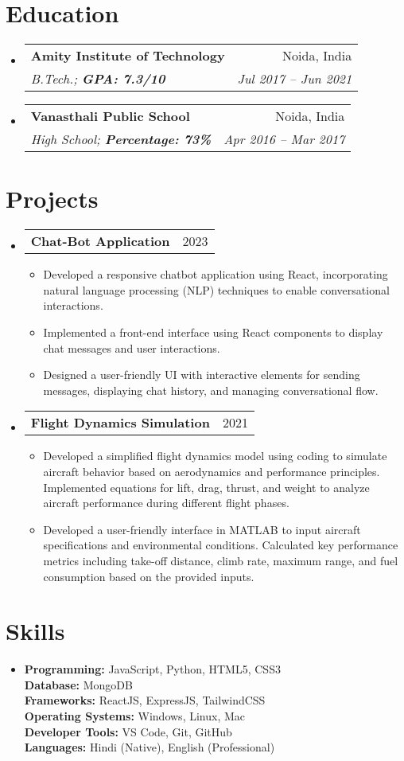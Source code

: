 \documentclass[letterpaper,12pt]{article}
\makeatletter
\newcommand{\resumeItem}[1]{
  \item\small{
    {#1 \vspace{-2pt}}
  }
}
\newcommand{\resumeEducationHeading}[4]{
  \vspace{-2pt}\item
    \begin{tabular*}{0.97\textwidth}[t]{l@{\extracolsep{\fill}}r}
      \textbf{#1} & #2 \\
      \textit{\small#3} & \textit{\small #4} \\
    \end{tabular*}\vspace{-5pt}
}
\newcommand{\resumeProjectHeading}[2]{
    \vspace{-2pt}\item
    \begin{tabular*}{0.97\textwidth}{l@{\extracolsep{\fill}}r}
      \small#1 & #2 \\
    \end{tabular*}\vspace{-7pt}
}
\newcommand{\resumeSubHeadingListStart}{\begin{itemize}[leftmargin=0.15in, label={}]}
\newcommand{\resumeSubHeadingListEnd}{\end{itemize}}
\newcommand{\resumeItemListStart}{\begin{itemize}}
\newcommand{\resumeItemListEnd}{\end{itemize}\vspace{-5pt}}
\makeatother
\begin{document}
\section{Education}
  \vspace{3pt}
  \resumeSubHeadingListStart
    \resumeEducationHeading
      {Amity Institute of Technology}{Noida, India}
      {B.Tech.; \textbf{GPA: 7.3/10}}{Jul 2017 -- Jun 2021}
    \resumeEducationHeading
      {Vanasthali Public School}{Noida, India}
      {High School; \textbf{Percentage: 73\%}}{Apr 2016 -- Mar 2017}
  \resumeSubHeadingListEnd

\section{Projects}
  \vspace{3pt}
  \resumeSubHeadingListStart
    \resumeProjectHeading
      {\textbf{Chat-Bot Application}}{2023}
        \resumeItemListStart
            \resumeItem{Developed a responsive chatbot application using React, incorporating natural language processing (NLP) techniques to enable conversational interactions.}
            \resumeItem{Implemented a front-end interface using React components to display chat messages and user interactions.}
            \resumeItem{Designed a user-friendly UI with interactive elements for sending messages, displaying chat history, and managing conversational flow.}
        \resumeItemListEnd

    \resumeProjectHeading
      {\textbf{Flight Dynamics Simulation}}{2021}
        \resumeItemListStart
            \resumeItem{Developed a simplified flight dynamics model using coding to simulate aircraft behavior based on aerodynamics and performance principles. Implemented equations for lift, drag, thrust, and weight to analyze aircraft performance during different flight phases.}
            \resumeItem{Developed a user-friendly interface in MATLAB to input aircraft specifications and environmental conditions. Calculated key performance metrics including take-off distance, climb rate, maximum range, and fuel consumption based on the provided inputs.}
        \resumeItemListEnd
  \resumeSubHeadingListEnd

\section{Skills}
  \vspace{2pt}
  \resumeSubHeadingListStart
    \item{
        \textbf{Programming:}{ JavaScript, Python, HTML5, CSS3} \\
        \textbf{Database:}{ MongoDB} \\
        \textbf{Frameworks:}{ ReactJS, ExpressJS, TailwindCSS} \\
        \textbf{Operating Systems:}{ Windows, Linux, Mac} \\
        \textbf{Developer Tools:}{ VS Code, Git, GitHub} \\
        \textbf{Languages:}{ Hindi (Native), English (Professional)}
    }
  \resumeSubHeadingListEnd
\end{document}
